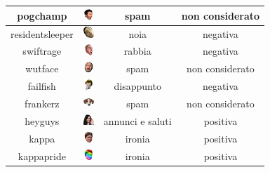 \documentclass[a4paper,12pt,openright,twoside]{report}
\theoremstyle{definition}
\begin{document}
\begin{table}[H]
\begin{center}
\begin{tabular}{|c|c|c|c|}
\hline
pogchamp & \includegraphics[height=0.4cm, width=0.4cm]{Immagini/Emoticons/pogchamp.png} & spam & non considerato \\
\hline
residentsleeper & \includegraphics[height=0.4cm, width=0.4cm]{Immagini/Emoticons/residentsleeper.png} & noia & negativa \\
\hline
swiftrage & \includegraphics[height=0.4cm, width=0.4cm]{Immagini/Emoticons/swiftrage.png} & rabbia & negativa \\
\hline
wutface & \includegraphics[height=0.4cm, width=0.4cm]{Immagini/Emoticons/wutface.png} & spam & non considerato \\
\hline
failfish & \includegraphics[height=0.4cm, width=0.4cm]{Immagini/Emoticons/failfish.png} & disappunto & negativa \\
\hline
frankerz & \includegraphics[height=0.4cm, width=0.4cm]{Immagini/Emoticons/frankerz.png} & spam & non considerato \\
\hline
heyguys & \includegraphics[height=0.4cm, width=0.4cm]{Immagini/Emoticons/heyguys.png} & annunci e saluti & positiva \\
\hline
kappa & \includegraphics[height=0.4cm, width=0.4cm]{Immagini/Emoticons/kappahd.png} & ironia & positiva \\
\hline
kappapride & \includegraphics[height=0.4cm, width=0.4cm]{Immagini/Emoticons/kappapride.png} & ironia & positiva \\

\end{tabular}
\end{center}
\end{table}
\end{document}
